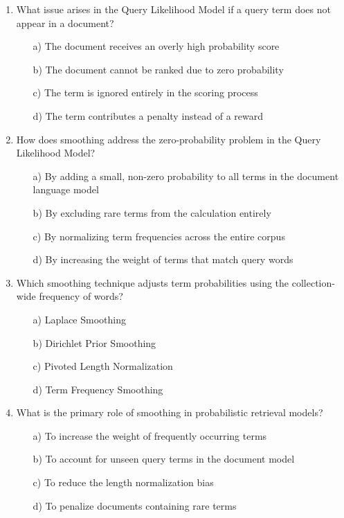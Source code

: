 \documentclass[8pt]{extarticle}
\begin{document}
\begin{multicols}{2}
\begin{enumerate}
\item What issue arises in the Query Likelihood Model if a query term does not appear in a document?
\begin{itemize}
    \item[a)] The document receives an overly high probability score
    \item[b)] The document cannot be ranked due to zero probability
    \item[c)] The term is ignored entirely in the scoring process
    \item[d)] The term contributes a penalty instead of a reward
\end{itemize}
 

\item How does smoothing address the zero-probability problem in the Query Likelihood Model?
\begin{itemize}
    \item[a)] By adding a small, non-zero probability to all terms in the document language model
    \item[b)] By excluding rare terms from the calculation entirely
    \item[c)] By normalizing term frequencies across the entire corpus
    \item[d)] By increasing the weight of terms that match query words
\end{itemize}
 

\item Which smoothing technique adjusts term probabilities using the collection-wide frequency of words?
\begin{itemize}
    \item[a)] Laplace Smoothing
    \item[b)] Dirichlet Prior Smoothing
    \item[c)] Pivoted Length Normalization
    \item[d)] Term Frequency Smoothing
\end{itemize}
 

\item What is the primary role of smoothing in probabilistic retrieval models?
\begin{itemize}
    \item[a)] To increase the weight of frequently occurring terms
    \item[b)] To account for unseen query terms in the document model
    \item[c)] To reduce the length normalization bias
    \item[d)] To penalize documents containing rare terms
\end{itemize}
 


\end{enumerate}
\end{multicols}
\end{document}

